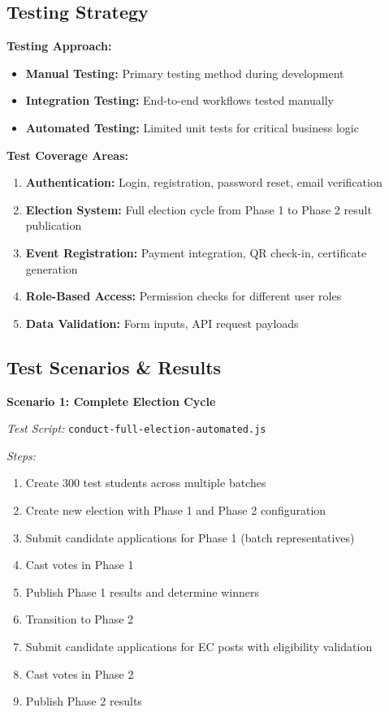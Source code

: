 \documentclass[12pt,a4paper]{article}
\begin{document}
\subsection{Testing Strategy}

\textbf{Testing Approach:}
\begin{itemize}[noitemsep]
  \item \textbf{Manual Testing:} Primary testing method during development
  \item \textbf{Integration Testing:} End-to-end workflows tested manually
  \item \textbf{Automated Testing:} Limited unit tests for critical business logic
\end{itemize}

\textbf{Test Coverage Areas:}
\begin{enumerate}[noitemsep]
  \item \textbf{Authentication:} Login, registration, password reset, email verification
  \item \textbf{Election System:} Full election cycle from Phase 1 to Phase 2 result publication
  \item \textbf{Event Registration:} Payment integration, QR check-in, certificate generation
  \item \textbf{Role-Based Access:} Permission checks for different user roles
  \item \textbf{Data Validation:} Form inputs, API request payloads
\end{enumerate}

\subsection{Test Scenarios \& Results}

\textbf{Scenario 1: Complete Election Cycle}

\textit{Test Script:} \texttt{conduct-full-election-automated.js}

\textit{Steps:}
\begin{enumerate}[noitemsep]
  \item Create 300 test students across multiple batches
  \item Create new election with Phase 1 and Phase 2 configuration
  \item Submit candidate applications for Phase 1 (batch representatives)
  \item Cast votes in Phase 1
  \item Publish Phase 1 results and determine winners
  \item Transition to Phase 2
  \item Submit candidate applications for EC posts with eligibility validation
  \item Cast votes in Phase 2
  \item Publish Phase 2 results
\end{enumerate}
\end{document}
